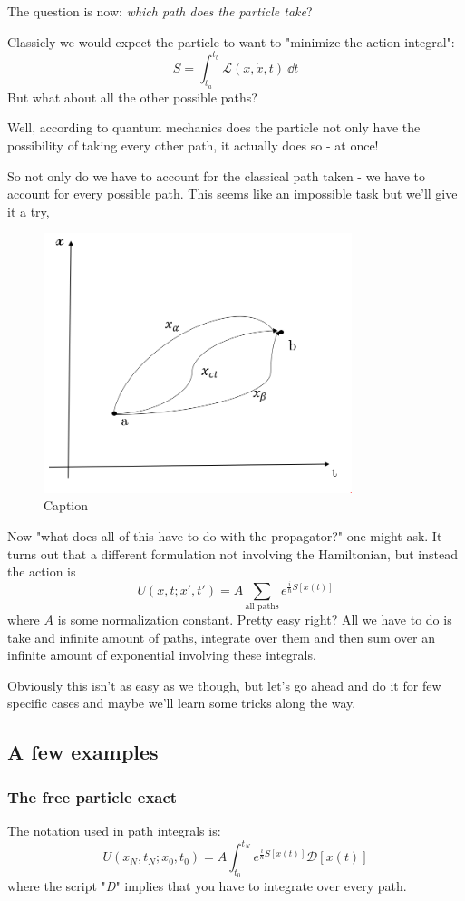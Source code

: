 \documentclass[a4,10pt,titlepage]{article}
\renewcommand\[{\begin{equation*}}
\renewcommand\]{\end{equation*}}
\newcommand{\be}{\begin{equation}}
\newcommand{\ee}{\end{equation}}
\numberwithin{equation}{section}
\newcommand{\PD}{\mathscr{D}}
\begin{document}
The question is now: \textit{which path does the particle take}?

Classicly we would expect the particle to want to "minimize the action integral":
\be
S=\int_{t_a}^{t_b} \mathcal{L}(x,\dot{x},t)\:\dd t
\ee
But what about all the other possible paths?

Well, according to quantum mechanics does the particle not only have the possibility of taking every other path, it actually does so - at once!

So not only do we have to account for the classical path taken - we have to account for every possible path. This seems like an impossible task but we'll give it a try,
\begin{figure}[htb]
    \centering
    \includegraphics[width=9cm]{Pathint2.PNG}
    \caption{Caption}
    \label{fig:my_label5}
\end{figure}

Now "what does all of this have to do with the propagator?" one might ask. It turns out that a different formulation not involving the Hamiltonian, but instead the action is
\[
U(x,t;x',t')=A\sum_{\text{all paths}}e^{\frac{i}{\hbar} S[x(t)]}
\]
where $A$ is some normalization constant. Pretty easy right? All we have to do is take and infinite amount of paths, integrate over them and then sum over an infinite amount of exponential involving these integrals.

Obviously this isn't as easy as we though, but let's go ahead and do it for few specific cases and maybe we'll learn some tricks along the way.
\subsection{A few examples}
\subsubsection{The free particle exact}
The notation used in path integrals is:
\be
U(x_N,t_N;x_0,t_0)=A\int^{t_N}_{t_0}e^{\frac{i}{\hbar}S[x(t)]}\PD[x(t)]
\ee
where the script "\textit{D}" implies that you have to integrate over every path. 
\end{document}
